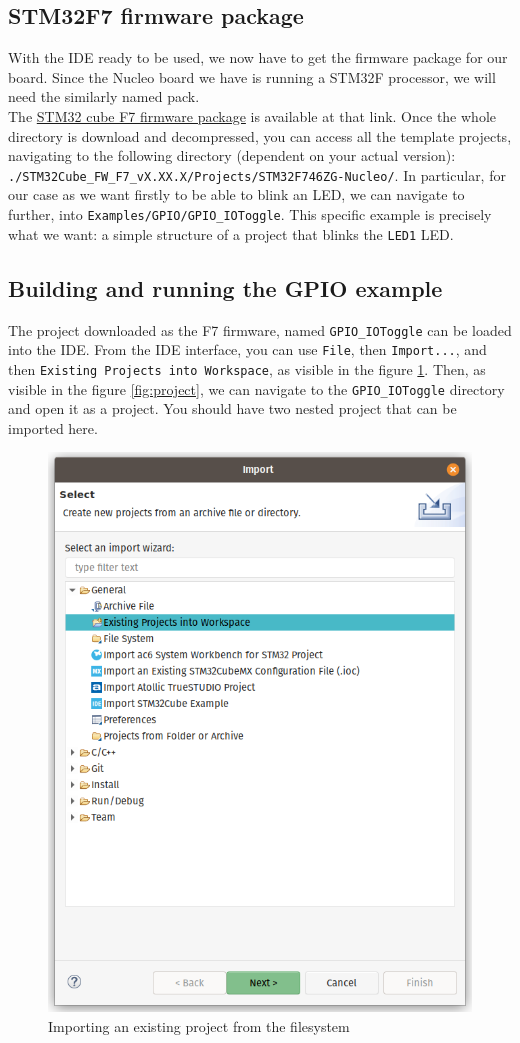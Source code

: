 \documentclass[10pt]{article}
\begin{document}
\subsection{STM32F7 firmware package}
\label{sec:stm32f7-firmw-pack}
With the IDE ready to be used, we now have to get the firmware package for our board.
Since the Nucleo board we have is running a STM32F processor, we will need the similarly named pack.\\

The \href{https://www.st.com/content/st_com/en/products/embedded-software/mcu-mpu-embedded-software/stm32-embedded-software/stm32cube-mcu-mpu-packages/stm32cubef7.html}{STM32 cube F7 firmware package} is available at that link. Once the whole directory is download and decompressed, you can access all the template projects, navigating to the following directory (dependent on your actual version): \verb|./STM32Cube_FW_F7_vX.XX.X/Projects/STM32F746ZG-Nucleo/|. In particular, for our case as we want firstly to be able to blink an LED, we can navigate to further, into \verb|Examples/GPIO/GPIO_IOToggle|. This specific example is precisely what we want: a simple structure of a project that blinks the \verb|LED1| LED.

\subsection{Building and running the GPIO example}
\label{sec:build-runn-gpio}
The project downloaded as the F7 firmware, named \verb|GPIO_IOToggle| can be loaded into the IDE.
From the IDE interface, you can use \verb|File|, then \verb|Import...|, and then \verb|Existing Projects into Workspace|, as visible in the figure \ref{fig:import}. Then, as visible in the figure \ref{fig:project}, we can navigate to the \verb|GPIO_IOToggle| directory and open it as a project. You should have two nested project that can be imported here.

\begin{figure}[h]
  \centering
  \includegraphics[width=.5\textwidth]{./img/import.png}
  \caption{Importing an existing project from the filesystem}
  \label{fig:import}
\end{figure}
\end{document}
